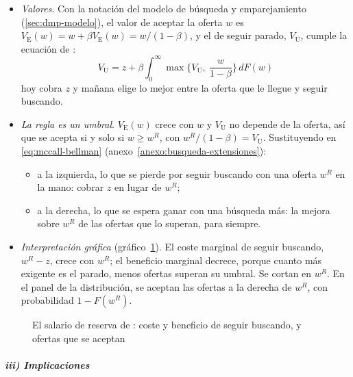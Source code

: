 \documentclass[11pt]{article}
\begin{document}
\begin{itemize}
\item \emph{Valores}. Con la notación del modelo de búsqueda y emparejamiento (\ref{sec:dmp-modelo}), el valor de aceptar la oferta $w$ es $V_{\mathrm E}(w)=w+\beta V_{\mathrm E}(w)=w/(1-\beta)$, y el de seguir parado, $V_{\mathrm U}$, cumple la ecuación de :
  \begin{equation}
  V_{\mathrm U}=z+\beta\int_0^{\infty}\max\Big\{V_{\mathrm U},\ \frac{w}{1-\beta}\Big\}\,dF(w)\label{eq:mccall-bellman}
  \end{equation}
  hoy cobra $z$ y mañana elige lo mejor entre la oferta que le llegue y seguir buscando.
\item \emph{La regla es un umbral}. $V_{\mathrm E}(w)$ crece con $w$ y $V_{\mathrm U}$ no depende de la oferta, así que se acepta si y solo si $w\geq w^R$, con $w^R/(1-\beta)=V_{\mathrm U}$. Sustituyendo en \eqref{eq:mccall-bellman} (anexo~\ref{anexo:busqueda-extensiones}):
  \begin{itemize}
  \item a la izquierda, lo que se pierde por seguir buscando con una oferta $w^R$ en la mano: cobrar $z$ en lugar de $w^R$;
  \item a la derecha, lo que se espera ganar con una búsqueda más: la mejora sobre $w^R$ de las ofertas que lo superan, para siempre.
  \end{itemize}
\item \emph{Interpretación gráfica} (gráfico~\ref{fig:mccall}). El coste marginal de seguir buscando, $w^R-z$, crece con $w^R$; el beneficio marginal decrece, porque cuanto más exigente es el parado, menos ofertas superan su umbral. Se cortan en $w^R$. En el panel de la distribución, se aceptan las ofertas a la derecha de $w^R$, con probabilidad $1-F(w^R)$.
\end{itemize}

\begin{figure}[H]
\centering
\caption{El salario de reserva de : coste y beneficio de seguir buscando, y ofertas que se aceptan}\label{fig:mccall}
\end{figure}

\subparagraph{iii) Implicaciones}
\end{document}
